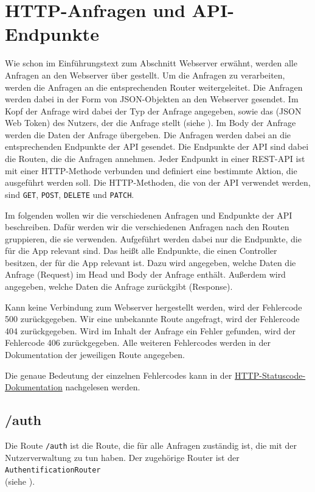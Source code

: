 \documentclass{entwurfsheft}
\begin{document}
\begin{sloppypar}
\section{HTTP-Anfragen und API-Endpunkte} \label{sec:HTTP-Anfragen und API-Endpunkte}
Wie schon im Einführungstext zum Abschnitt Webserver erwähnt, werden alle Anfragen an den Webserver über  gestellt.
Um die Anfragen zu verarbeiten, werden die Anfragen an die entsprechenden Router weitergeleitet.
Die Anfragen werden dabei in der Form von JSON-Objekten an den Webserver gesendet.
Im Kopf der Anfrage wird dabei der Typ der Anfrage angegeben, sowie das  (JSON Web Token) des Nutzers, der die Anfrage stellt (siehe ).
Im Body der Anfrage werden die Daten der Anfrage übergeben.
Die Anfragen werden dabei an die entsprechenden Endpunkte der API gesendet.
Die Endpunkte der API sind dabei die Routen, die die Anfragen annehmen.
Jeder Endpunkt in einer REST-API ist mit einer HTTP-Methode verbunden und definiert eine bestimmte Aktion, die ausgeführt werden soll.
Die HTTP-Methoden, die von der API verwendet werden, sind \texttt{GET}, \texttt{POST}, \texttt{DELETE} und \texttt{PATCH}.

Im folgenden wollen wir die verschiedenen Anfragen und Endpunkte der API beschreiben.
Dafür werden wir die verschiedenen Anfragen nach den Routen gruppieren, die sie verwenden.
Aufgeführt werden dabei nur die Endpunkte, die für die App relevant sind. 
Das heißt alle Endpunkte, die einen Controller besitzen, der für die App relevant ist.
Dazu wird angegeben, welche Daten die Anfrage (Request) im Head und Body der Anfrage enthält.
Außerdem wird angegeben, welche Daten die Anfrage zurückgibt (Response).

Kann keine Verbindung zum Webserver hergestellt werden, wird der Fehlercode 500 zurückgegeben.
Wir eine unbekannte Route angefragt, wird der Fehlercode 404 zurückgegeben.
Wird im Inhalt der Anfrage ein Fehler gefunden, wird der Fehlercode 406 zurückgegeben.
Alle weiteren Fehlercodes werden in der Dokumentation der jeweiligen Route angegeben.

Die genaue Bedeutung der einzelnen Fehlercodes kann in der \href{https://developer.mozilla.org/de/docs/Web/HTTP/Status}{HTTP-Statuscode-Dokumentation} nachgelesen werden.

\subsection{/auth}
Die Route \texttt{/auth} ist die Route, die für alle Anfragen zuständig ist, die mit der Nutzerverwaltung zu tun haben.
Der zugehörige Router ist der \texttt{AuthentificationRouter} \\ (siehe ).


\end{sloppypar}
\end{document}
